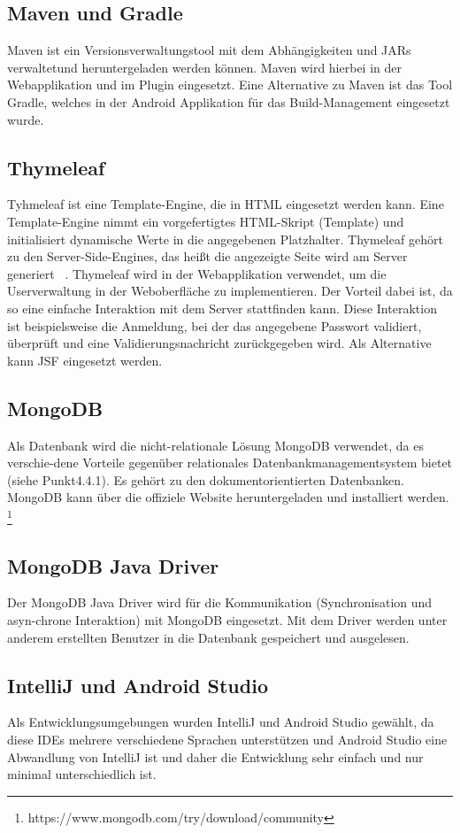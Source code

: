 \subsection{Maven und Gradle}
Maven ist ein Versionsverwaltungstool mit dem Abhängigkeiten und JARs verwaltetund heruntergeladen werden können. Maven wird hierbei in der Webapplikation und im Plugin eingesetzt. Eine Alternative zu Maven ist das Tool Gradle, welches in der Android Applikation für das Build-Management eingesetzt wurde.
\subsection{Thymeleaf}
Tyhmeleaf ist eine Template-Engine, die in HTML eingesetzt werden kann. Eine Template-Engine nimmt ein vorgefertigtes HTML-Skript (Template) und initialisiert dynamische Werte in die angegebenen Platzhalter. Thymeleaf gehört zu den Server-Side-Engines, das heißt die angezeigte Seite wird am Server generiert ~\parencite{searchmetrics}. Thymeleaf wird in der Webapplikation verwendet, um die Userverwaltung in der Weboberfläche zu implementieren. Der Vorteil dabei ist, da so eine einfache Interaktion mit dem Server stattfinden kann. Diese Interaktion ist beispielsweise die Anmeldung, bei der das angegebene Passwort validiert, überprüft und eine Validierungsnachricht zurückgegeben wird. Als Alternative kann JSF eingesetzt werden. 
\subsection{MongoDB}
Als Datenbank wird die nicht-relationale Lösung MongoDB verwendet, da es verschie-dene Vorteile gegenüber relationales Datenbankmanagementsystem bietet (siehe Punkt4.4.1). Es gehört zu den dokumentorientierten Datenbanken. MongoDB kann über die offiziele Website heruntergeladen und installiert werden. \footnote{https://www.mongodb.com/try/download/community}
\subsection{MongoDB Java Driver}
Der MongoDB Java Driver wird für die Kommunikation (Synchronisation und asyn-chrone Interaktion) mit MongoDB eingesetzt. Mit dem Driver werden unter anderem erstellten Benutzer in die Datenbank gespeichert und ausgelesen.
\subsection{IntelliJ und Android Studio}
Als Entwicklungsumgebungen wurden IntelliJ und Android Studio gewählt, da diese IDEs mehrere verschiedene Sprachen unterstützen und Android Studio eine Abwandlung von IntelliJ ist und daher die Entwicklung sehr einfach und nur minimal unterschiedlich ist.
